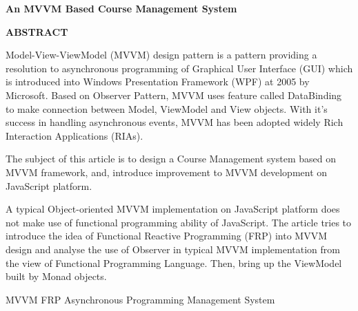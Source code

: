 \begin{center}
\textbf{An MVVM Based Course Management System}
\end{center}
\begin{center}
\textbf{ABSTRACT}
\end{center}
\vspace{2mm}

Model-View-ViewModel (MVVM) design pattern is a pattern providing a resolution to asynchronous programming of Graphical User Interface (GUI) which is introduced into Windows Presentation Framework (WPF) at 2005 by Microsoft. Based on Observer Pattern, MVVM uses feature called DataBinding to make connection between Model, ViewModel and View objects. With it's success in handling asynchronous events, MVVM has been adopted widely Rich Interaction Applications (RIAs).

The subject of this article is to design a Course Management system based on MVVM framework, and, introduce improvement to MVVM development on JavaScript platform.

A typical Object-oriented MVVM implementation on JavaScript platform does not make use of functional programming ability of JavaScript. The article tries to introduce the idea of Functional Reactive Programming (FRP) into MVVM design and analyse the use of Observer in typical MVVM implementation from the view of Functional Programming Language. Then, bring up the ViewModel built by Monad objects.

\vspace{3mm}
\quad MVVM \quad FRP \quad Asynchronous Programming \quad Management System
